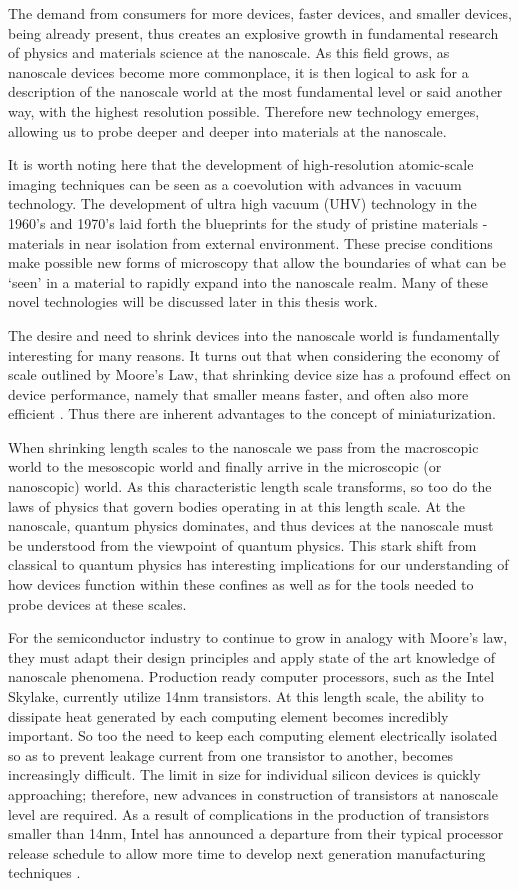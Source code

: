 The demand from consumers for more devices, faster devices, and smaller devices, being already present, thus creates an explosive growth in fundamental research of physics and materials science at the nanoscale. As this field grows, as nanoscale devices become more commonplace, it is then logical to ask for a description of the nanoscale world at the most fundamental level or said another way, with the highest resolution possible. Therefore new technology emerges, allowing us to probe deeper and deeper into materials at the nanoscale.

It is worth noting here that the development of high-resolution atomic-scale imaging techniques can be seen as a coevolution with advances in vacuum technology. The development of ultra high vacuum (UHV) technology in the 1960's and 1970's laid forth the blueprints for the study of pristine materials - materials in near isolation from external environment. These precise conditions make possible new forms of microscopy that allow the boundaries of what can be `seen' in a material to rapidly expand into the nanoscale realm. Many of these novel technologies will be discussed later in this thesis work.

The desire and need to shrink devices into the nanoscale world is fundamentally interesting for many reasons. It turns out that when considering the economy of scale outlined by Moore's Law, that shrinking device size has a profound effect on device performance, namely that smaller means faster, and often also more efficient \cite{Wolf-Nano}. Thus there are inherent advantages to the concept of miniaturization.

When shrinking length scales to the nanoscale we pass from the macroscopic world to the mesoscopic world and finally arrive in the microscopic (or nanoscopic) world. As this characteristic length scale transforms, so too do the laws of physics that govern bodies operating in at this length scale. At the nanoscale, quantum physics dominates, and thus devices at the nanoscale must be understood from the viewpoint of quantum physics. This stark shift from classical to quantum physics has interesting implications for our understanding of how devices function within these confines as well as for the tools needed to probe devices at these scales.

For the semiconductor industry to continue to grow in analogy with Moore's law, they must adapt their design principles and apply state of the art knowledge of nanoscale phenomena. Production ready computer processors, such as the Intel Skylake, currently utilize 14nm transistors. At this length scale, the ability to dissipate heat generated by each computing element becomes incredibly important. So too the need to keep each computing element electrically isolated so as to prevent leakage current from one transistor to another, becomes increasingly difficult. The limit in size for individual silicon devices is quickly approaching; therefore, new advances in construction of transistors at nanoscale level are required. As a result of complications in the production of transistors smaller than 14nm, Intel has announced a departure from their typical processor release schedule to allow more time to develop next generation manufacturing techniques \cite{ars-intel}.

